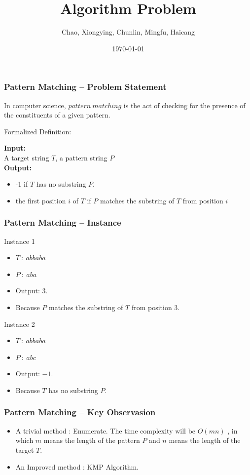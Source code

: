 \documentclass[slidestop,compress,mathserif]{beamer}
\begin{document}
\title{Algorithm Problem}
\author{Chao, Xiongying, Chunlin, Mingfu, Haicang}
\date{\today}



\frame
{
\frametitle{Pattern Matching -- Problem Statement}
In computer science, $ pattern \  matching$ is the act of checking for the presence of the constituents of a given pattern.
\begin{block}{Formalized Definition:}

{\bf Input: }\\

A target string $T$, a pattern string $P$\\

{\bf Output: }
\begin{itemize}
\item -1 if $T$ has no substring $P$.
\item the first position $i$ of $T$ if $P$ matches the substring of $T$ from position $i$
\end{itemize}

\end{block}
}

\frame
{
\frametitle{Pattern Matching -- Instance}
\begin{block}{Instance 1}
\begin{itemize}
 \item $T\ :\ abbaba$
 \item $P\ :\ aba$
 \item Output: $3.\ $
\item Because $P$ matches the substring of $T$ from position $3$.
\end{itemize}

\end{block}
\begin{block}{Instance 2}
\begin{itemize}
 \item $T\ :\ abbaba$
 \item $P\ :\ abc$
 \item Output: $-1.\ $
\item Because $T$ has no substring $P$.
\end{itemize}


\end{block}

}
\frame
{


\frametitle{Pattern Matching -- Key Observasion}
\begin{itemize}
 \item A trivial method : Enumerate. The time complexity will be $O(mn)$ , in which $m$ means the length of the pattern $P$ and $n$ means the length of the target $T$.
 \item An Improved method : KMP Algorithm.
\end{itemize}

}
\end{document}
